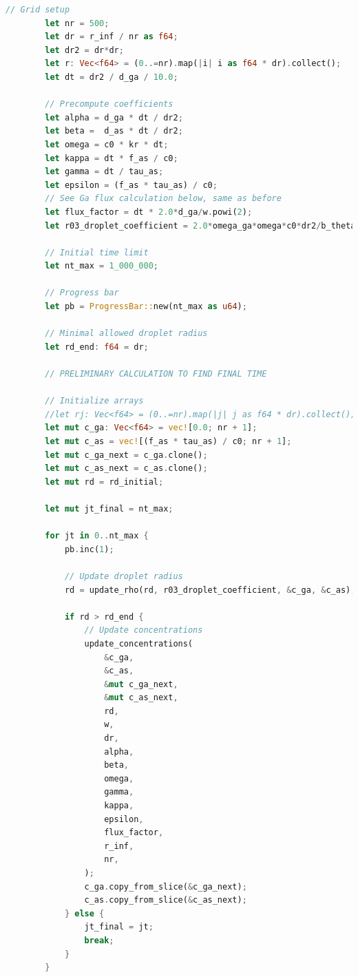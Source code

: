 \documentclass[14pt,oneside]{extarticle}
\begin{document}
\begin{lstlisting}[language=Rust]
        // Grid setup
        let nr = 500;
        let dr = r_inf / nr as f64;
        let dr2 = dr*dr;
        let r: Vec<f64> = (0..=nr).map(|i| i as f64 * dr).collect();
        let dt = dr2 / d_ga / 10.0;
    
        // Precompute coefficients
        let alpha = d_ga * dt / dr2;
        let beta =  d_as * dt / dr2;
        let omega = c0 * kr * dt;
        let kappa = dt * f_as / c0;
        let gamma = dt / tau_as;
        let epsilon = (f_as * tau_as) / c0;
        // See Ga flux calculation below, same as before
        let flux_factor = dt * 2.0*d_ga/w.powi(2);
        let r03_droplet_coefficient = 2.0*omega_ga*omega*c0*dr2/b_theta;
    
        // Initial time limit
        let nt_max = 1_000_000;
    
        // Progress bar
        let pb = ProgressBar::new(nt_max as u64);
    
        // Minimal allowed droplet radius
        let rd_end: f64 = dr;
    
        // PRELIMINARY CALCULATION TO FIND FINAL TIME
        
        // Initialize arrays
        //let rj: Vec<f64> = (0..=nr).map(|j| j as f64 * dr).collect();
        let mut c_ga: Vec<f64> = vec![0.0; nr + 1];
        let mut c_as = vec![(f_as * tau_as) / c0; nr + 1];
        let mut c_ga_next = c_ga.clone();
        let mut c_as_next = c_as.clone();
        let mut rd = rd_initial;
        
        let mut jt_final = nt_max;
    
        for jt in 0..nt_max {
            pb.inc(1);
    
            // Update droplet radius
            rd = update_rho(rd, r03_droplet_coefficient, &c_ga, &c_as);
    
            if rd > rd_end {
                // Update concentrations
                update_concentrations(
                    &c_ga,
                    &c_as,
                    &mut c_ga_next,
                    &mut c_as_next,
                    rd,
                    w,
                    dr,
                    alpha,
                    beta,
                    omega,
                    gamma,
                    kappa,
                    epsilon,
                    flux_factor,
                    r_inf,
                    nr,
                );
                c_ga.copy_from_slice(&c_ga_next);
                c_as.copy_from_slice(&c_as_next);
            } else {
                jt_final = jt;
                break;
            }
        }
    

\end{lstlisting}
\end{document}
